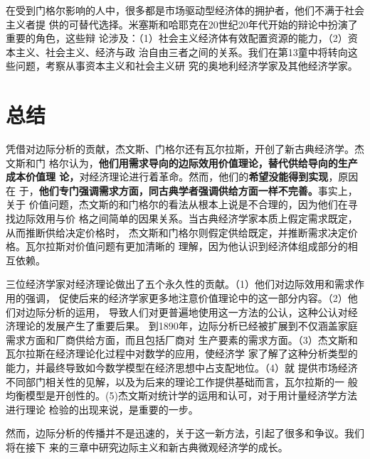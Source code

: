 在受到门格尔影响的人中，很多都是市场驱动型经济体的拥护者，他们不满于社会主义者提
供的可替代选择。米塞斯和哈耶克在20世纪20年代开始的辩论中扮演了重要的角色，这些辩
论涉及：（1）社会主义经济体有效配置资源的能力，（2）资本主义、社会主义、经济与政
治自由三者之间的关系。我们在第13童中将转向这些问题，考察从事资本主义和社会主义研
究的奥地利经济学家及其他经济学家。

\section{总结}

凭借对边际分析的贡献，杰文斯、门格尔还有瓦尔拉斯，开创了新古典经济学。杰文斯和门
格尔认为，\textbf{他们用需求导向的边际效用价值理论，替代供给导向的生产成本价值理
  论，}对经济理论进行着革命。然而，他们的\textbf{希望没能得到实现}，原因在
于，\textbf{他们专门强调需求方面，同古典学者强调供给方面一样不完善。}事实上，关于
价值问题，杰文斯的和门格尔的看法从根本上说是不合理的，因为他们在寻找边际效用与价
格之间简单的因果关系。当古典经济学家本质上假定需求既定，从而推断供给决定价格时，
杰文斯和门格尔则假定供给既定，并推断需求决定价格。瓦尔拉斯对价值问题有更加清晰的
理解，因为他认识到经济体组成部分的相互依赖。

三位经济学家对经济理论做出了五个永久性的贡献。（1）他们对边际效用和需求作用的强调，
促使后来的经济学家更多地注意价值理论中的这一部分内容。（2）他们对边际分析的运用，
导致人们对更普遍地使用这一方法的公认，这种公认对经济理论的发展产生了重要后果。
到1890年，边际分析已经被扩展到不仅涵盖家庭需求方面和厂商供给方面，而且包括厂商对
生产要素的需求方面。（3）杰文斯和瓦尔拉斯在经济理论化过程中对数学的应用，使经济学
家了解了这种分析类型的能力，并最终导致如今数学模型在经济思想中占支配地位。（4）就
提供市场经济不同部门相关性的见解，以及为后来的理论工作提供基础而言，瓦尔拉斯的一
般均衡模型是开创性的。(5)杰文斯对统计学的运用和认可，对于用计量经济学方法进行理论
检验的出现来说，是重要的一步。

然而，边际分析的传播并不是迅速的，关于这一新方法，引起了很多和争议。我们将在接下
来的三章中研究边际主义和新古典微观经济学的成长。


